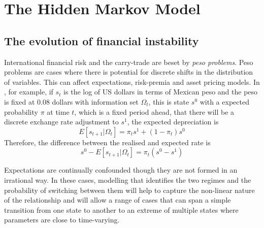 \documentclass[12pt, a4paper, oneside]{article}\usepackage[]{graphicx}\usepackage[]{color}
\begin{document}

\section{The Hidden Markov Model}
\subsection{The evolution of financial instability}
International financial risk and the carry-trade are beset by \emph{peso problems}. Peso problems are cases where there is  potential for discrete shifts in the distribution of variables.  This can affect expectations, risk-premia and asset pricing models. In \citet{evans199621}, for example, if $s_t$ is the log of US dollars in terms of Mexican peso and the peso is fixed at 0.08 dollars with information set $\Omega_t$, this is state $s^0$ with a expected probability $\pi$ at time $t$, which is a fixed period ahead, that there will be a discrete exchange rate adjustment to $s^1$, the expected depreciation is 
\begin{equation}
E[s_{t+1}|\Omega_t] = \pi_ts^1 + (1 - \pi_t)s^0
\end{equation}
Therefore, the difference between the realised and expected rate is 
\begin{equation}
s^0 - E[s_{t+1}|\Omega_t] = \pi_t(s^0 - s^1)
\end{equation}


Expectations are continually confounded though they are not formed in an irrational way. In these cases, modelling that identifies the two regimes and the probability of switching between them will help to capture the non-linear nature of the relationship and will allow a range of cases that can span a simple transition from one state to another to an extreme of multiple states where parameters are close to time-varying.  
\end{document}
